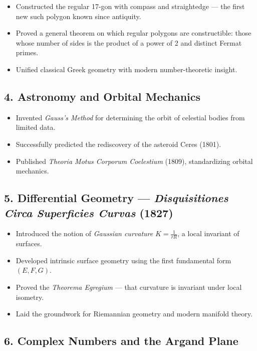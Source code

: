 \documentclass[9pt]{article}
\begin{document}
\begin{itemize}
  \item Constructed the regular 17-gon with compass and straightedge — the first new such polygon known since antiquity.
  \item Proved a general theorem on which regular polygons are constructible: those whose number of sides is the product of a power of 2 and distinct Fermat primes.
  \item Unified classical Greek geometry with modern number-theoretic insight.
\end{itemize}

\subsection*{4. Astronomy and Orbital Mechanics}

\begin{itemize}
  \item Invented \textit{Gauss’s Method} for determining the orbit of celestial bodies from limited data.
  \item Successfully predicted the rediscovery of the asteroid Ceres (1801).
  \item Published \textit{Theoria Motus Corporum Coelestium} (1809), standardizing orbital mechanics.
\end{itemize}

\subsection*{5. Differential Geometry — \textit{Disquisitiones Circa Superficies Curvas} (1827)}

\begin{itemize}
  \item Introduced the notion of \textit{Gaussian curvature} $K = \frac{1}{rR}$, a local invariant of surfaces.
  \item Developed intrinsic surface geometry using the first fundamental form $(E, F, G)$.
  \item Proved the \textit{Theorema Egregium} — that curvature is invariant under local isometry.
  \item Laid the groundwork for Riemannian geometry and modern manifold theory.
\end{itemize}

\subsection*{6. Complex Numbers and the Argand Plane}
\end{document}

